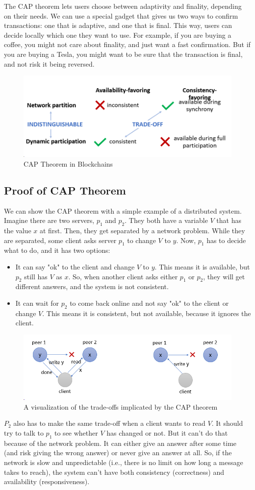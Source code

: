 	The CAP theorem lets users choose between adaptivity and finality, depending on their needs. We can use a special gadget that gives us two ways to confirm transactions: one that is adaptive, and one that is final. This way, users can decide locally which one they want to use. For example, if you are buying a coffee, you might not care about finality, and just want a fast confirmation. But if you are buying a Tesla, you might want to be sure that the transaction is final, and not risk it being reversed.
	\begin{figure}[h!]
		\centering
		\includegraphics[width=0.5\linewidth]{Fig/17/F4}
		\caption{CAP Theorem in Blockchains}
		\label{fig:L17_f4}
	\end{figure}
	
	\subsection{Proof of CAP Theorem}
	We can show the CAP theorem with a simple example of a distributed system. Imagine there are two servers, $p_1$ and $p_2$. They both have a variable $V$ that has the value $x$ at first. Then, they get separated by a network problem. While they are separated, some client asks server $p_1$ to change $V$ to $y$. Now, $p_1$ has to decide what to do, and it has two options:
	\begin{itemize}
		\item It can say "ok" to the client and change $V$ to $y$. This means it is available, but $p_2$ still has $V$ as $x$. So, when another client asks either $p_1$ or $p_2$, they will get different answers, and the system is not consistent.
		\item It can wait for $p_2$ to come back online and not say "ok" to the client or change $V$. This means it is consistent, but not available, because it ignores the client.
	\end{itemize}
	\begin{figure}[h!]
		\centering
		\includegraphics[width=0.7\linewidth]{Fig/17/F5}
		\caption{A visualization of the trade-offs implicated by the CAP theorem}
		\label{fig:L17_f5}
	\end{figure}
	$P_2$ also has to make the same trade-off when a client wants to read $V$. It should try to talk to $p_1$ to see whether $V$ has changed or not. But it can’t do that because of the network problem. It can either give an answer after some time (and risk giving the wrong answer) or never give an answer at all. So, if the network is slow and unpredictable (i.e., there is no limit on how long a message takes to reach), the system can’t have both consistency (correctness) and availability (responsiveness).
